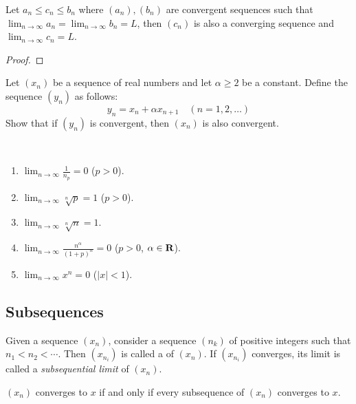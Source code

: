\begin{theorem}
Let $a_n\le c_n\le b_n$ where $(a_n),(b_n)$ are convergent sequences such that $\displaystyle\lim_{n\to\infty}a_n=\lim_{n\to\infty}b_n=L$, then $(c_n)$ is also a converging sequence and $\displaystyle\lim_{n\to\infty}c_n=L$.
\end{theorem}

\begin{proof}

\end{proof}

\begin{exercise}
Let $(x_n)$ be a sequence of real numbers and let $\alpha\ge2$ be a constant. Define the sequence $(y_n)$ as follows:
\[y_n=x_n+\alpha x_{n+1}\quad(n=1,2,\dots)\]
Show that if $(y_n)$ is convergent, then $(x_n)$ is also convergent.
\end{exercise}

\begin{exercise} \
\begin{enumerate}[label=(\roman*)]
\item $\displaystyle\lim_{n\to\infty}\frac{1}{n_p}=0$ ($p>0$).
\item $\displaystyle\lim_{n\to\infty}\sqrt[n]{p}=1$ ($p>0$).
\item $\displaystyle\lim_{n\to\infty}\sqrt[n]{n}=1$.
\item $\displaystyle\lim_{n\to\infty}\frac{n^\alpha}{(1+p)^n}=0$ ($p>0$, $\alpha\in\mathbf R$).
\item $\displaystyle\lim_{n\to\infty}x^n=0$ ($|x|<1$).
\end{enumerate}
\end{exercise}

\subsection{Subsequences}
\begin{definition}[Subsequence]
Given a sequence $(x_n)$, consider a sequence $(n_k)$ of positive integers such that $n_1<n_2<\cdots$. Then $(x_{n_i})$ is called a  of $(x_n)$. If $(x_{n_i})$ converges, its limit is called a \emph{subsequential limit} of $(x_n)$.
\end{definition}

\begin{proposition}
$(x_n)$ converges to $x$ if and only if every subsequence of $(x_n)$ converges to $x$.
\end{proposition}

